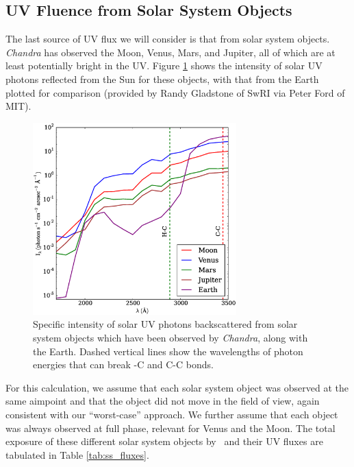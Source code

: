 \documentclass[11pt]{article}
\begin{document}
\subsection{UV Fluence from Solar System Objects}\label{sec:ssobj}

The last source of UV flux we will consider is that from solar system objects. {\it Chandra} has observed the
Moon, Venus, Mars, and Jupiter, all of which are at least potentially bright in the UV. Figure \ref{fig:ss_obj_intensity}
shows the intensity of solar UV photons reflected from the Sun for these objects, with that from the Earth plotted for
comparison (provided by Randy Gladstone of SwRI via Peter Ford of MIT).

\begin{figure}
\begin{center}
\includegraphics[width=0.7\textwidth]{ss_obj_intensity.eps}
\caption{Specific intensity of solar UV photons backscattered from solar system objects which have been observed by
{\it Chandra}, along with the Earth. Dashed vertical lines show the wavelengths of photon energies that can break
-C and C-C bonds.\label{fig:ss_obj_intensity}}
\end{center}
\end{figure}

For this calculation, we assume that each solar system object was observed at the same aimpoint and that the object
did not move in the field of view, again consistent with our ``worst-case'' approach. We further assume that each
object was always observed at full phase, relevant for Venus and the Moon. The total exposure of these different
solar system objects by \chandra~and their UV fluxes are tabulated in Table \ref{tab:ss_fluxes}.
\end{document}
